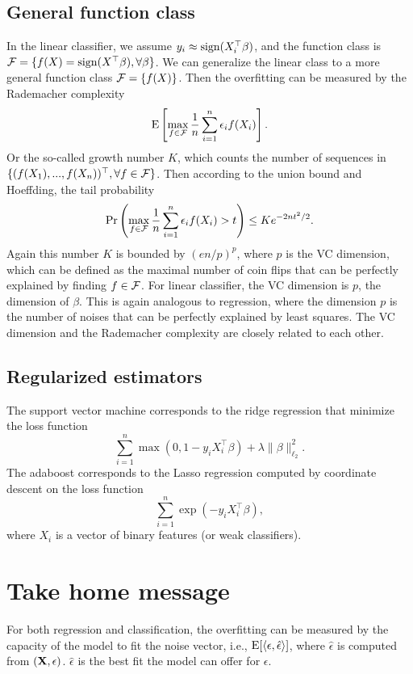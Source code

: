 \documentclass[11pt]{article}
\newcommand{\E}{\mathbb{E}}
\def\T{{\top}}
\def\E{{\rm E}}
\def\T{{\top}}
\def\X{{\bf X}}
\begin{document}
\subsection{General function class} 

In the linear classifier, we assume $y_i \approx {\rm sign}(X_i^\T \beta)$, and the function class is ${\cal F} = \{f(X) = {\rm sign}(X^\T \beta), \forall \beta\}$. We can generalize the linear class to a more general function class ${\cal F} = \{f(X)\}$. Then the overfitting can be measured by the Rademacher complexity 
\[
      \E\left[\max_{f \in {\cal F}} \frac{1}{n} \sum_{i=1}^{n} \epsilon_i f(X_i)\right]. 
 \]
Or the so-called growth number $K$, which counts the number of  sequences in $\{(f(X_1), ..., f(X_n))^\T, \forall f \in {\cal F}\}$. Then according to the union bound and Hoeffding, the tail probability 
\[
     \Pr\left(\max_{f \in {\cal F}} \frac{1}{n} \sum_{i=1}^{n} \epsilon_i f(X_i) > t\right) \leq K e^{-2nt^2/2}. 
\]
Again this number $K$ is bounded by $(en/p)^p$, where $p$ is the 
 VC dimension, which can be defined as the maximal number of coin flips that can be perfectly explained by finding $f \in {\cal F}$. For linear classifier, the VC dimension is $p$, the dimension of $\beta$. This is again analogous to regression, where the dimension $p$ is the number of noises that can be perfectly explained by least squares. The VC dimension and the Rademacher complexity are closely related to each other. 

\subsection{Regularized estimators} 

The support vector machine corresponds to the ridge regression that minimize the loss function 
\[
    \sum_{i=1}^{n} \max(0, 1-y_i X_i^\T\beta) + \lambda \|\beta\|_{\ell_2}^2. 
\]
The adaboost corresponds to the Lasso regression computed by coordinate descent on the loss function 
\[
    \sum_{i=1}^{n} \exp(-y_i X_i^\T \beta), 
\]
where $X_i$ is a vector of binary features (or weak classifiers). 

\section{Take home message} 

For both regression and classification, the overfitting can be measured by the capacity of the model to fit the noise vector, i.e., $\E[\langle \epsilon, \hat{\epsilon}\rangle]$, where $\hat{\epsilon}$ is computed from $(\X, \epsilon)$. $\hat{\epsilon}$ is the best fit the model can offer for $\epsilon$. 
\end{document}
